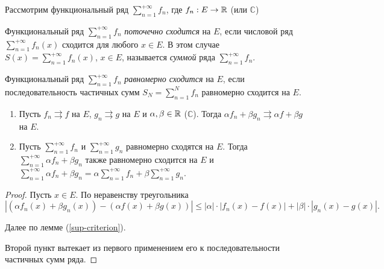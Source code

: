 Рассмотрим функциональный ряд $\sum_{n = 1}^{+\infty} f_n$, где $f_n : E \rightarrow \mathbb{R}$ (или $\mathbb{C}$)

\begin{definition}
    Функциональный ряд $\sum_{n = 1}^{+\infty} f_n$ \emph{поточечно сходится} на $E$, если числовой ряд $\sum_{n = 1}^{+\infty} f_n(x)$ сходится для любого $x \in E$. В этом случае $S(x) = \sum_{n = 1}^{+\infty} f_n(x)$, $x \in E$, называется \emph{суммой} ряда $\sum_{n = 1}^{+\infty} f_n$.

    Функциональный ряд $\sum_{n = 1}^{+\infty} f_n$ \emph{равномерно сходится} на $E$, если последовательность частичных сумм $S_N = \sum_{n = 1}^N f_n$ равномерно сходится на $E$.
\end{definition}

\begin{property}[линейность]
    \begin{enumerate}
        \item Пусть $f_n \rightrightarrows f$ на $E$, $g_n \rightrightarrows g$ на $E$ и $\alpha, \beta \in \mathbb{R}$ ($\mathbb{C}$). Тогда $\alpha f_n + \beta g_n \rightrightarrows \alpha f + \beta g$ на $E$.

        \item Пусть $\sum_{n = 1}^{+\infty} f_n$ и $\sum_{n = 1}^{+\infty} g_n$ равномерно сходятся на $E$. Тогда $\sum_{n = 1}^{+\infty} \alpha f_n + \beta g_n$ также равномерно сходится на $E$ и $\sum_{n = 1}^{+\infty} \alpha f_n + \beta g_n = \alpha \sum_{n = 1}^{+\infty} f_n + \beta \sum_{n = 1}^{+\infty} g_n$.
    \end{enumerate}

    \begin{proof}
        Пусть $x \in E$. По неравенству треугольника
        \[
            |(\alpha f_n(x) + \beta g_n(x)) - (\alpha f(x) + \beta g(x))| \le |\alpha| \cdot |f_n(x) - f(x)| + |\beta| \cdot |g_n(x) - g(x)|.
        \]

        Далее по лемме (\ref{sup-criterion}).

        Второй пункт вытекает из первого применением его к последовательности частичных сумм ряда.
    \end{proof}
\end{property}

